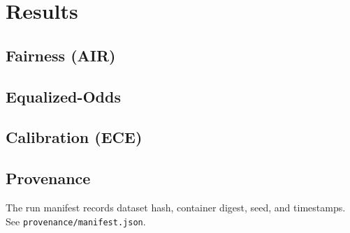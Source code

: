 
\section{Results}
\subsection{Fairness (AIR)}


\subsection{Equalized-Odds}


\subsection{Calibration (ECE)}


\subsection{Provenance}
The run manifest records dataset hash, container digest, seed, and timestamps. See \texttt{provenance/manifest.json}.
